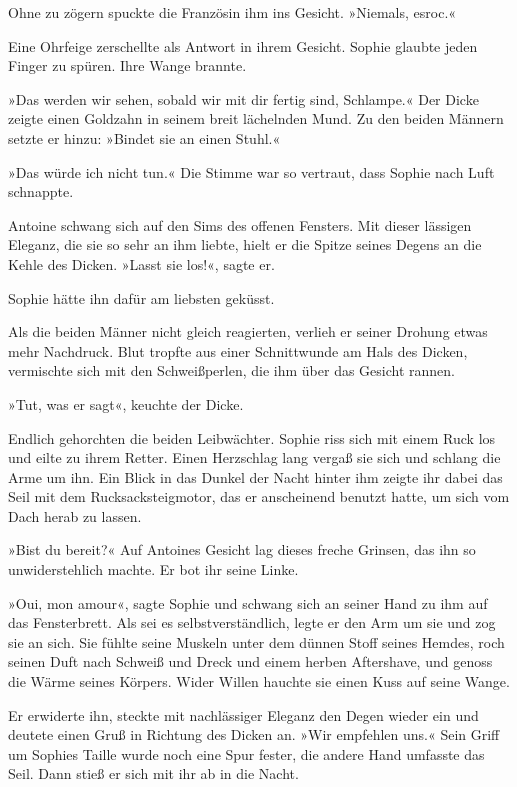 Ohne zu zögern spuckte die Französin ihm ins Gesicht. »Niemals,
esroc.«

Eine Ohrfeige zerschellte als Antwort in ihrem Gesicht. Sophie
glaubte jeden Finger zu spüren. Ihre Wange brannte.

»Das werden wir sehen, sobald wir mit dir fertig sind, Schlampe.«
Der Dicke zeigte einen Goldzahn in seinem breit lächelnden Mund. Zu
den beiden Männern setzte er hinzu: »Bindet sie an einen Stuhl.«

»Das würde ich nicht tun.« Die Stimme war so vertraut, dass Sophie
nach Luft schnappte.

Antoine schwang sich auf den Sims des offenen Fensters. Mit dieser
lässigen Eleganz, die sie so sehr an ihm liebte, hielt er die
Spitze seines Degens an die Kehle des Dicken. »Lasst sie los!«,
sagte er.

Sophie hätte ihn dafür am liebsten geküsst.

Als die beiden Männer nicht gleich reagierten, verlieh er seiner
Drohung etwas mehr Nachdruck. Blut tropfte aus einer Schnittwunde
am Hals des Dicken, vermischte sich mit den Schweißperlen, die ihm
über das Gesicht rannen.

»Tut, was er sagt«, keuchte der Dicke.

Endlich gehorchten die beiden Leibwächter. Sophie riss sich mit
einem Ruck los und eilte zu ihrem Retter. Einen Herzschlag lang
vergaß sie sich und schlang die Arme um ihn. Ein Blick in das
Dunkel der Nacht hinter ihm zeigte ihr dabei das Seil mit dem
Rucksacksteigmotor, das er anscheinend benutzt hatte, um sich vom
Dach herab zu lassen.

»Bist du bereit?« Auf Antoines Gesicht lag dieses freche Grinsen,
das ihn so unwiderstehlich machte. Er bot ihr seine Linke.

»Oui, mon amour«, sagte Sophie und schwang sich an seiner Hand zu
ihm auf das Fensterbrett. Als sei es selbstverständlich, legte er
den Arm um sie und zog sie an sich. Sie fühlte seine Muskeln unter
dem dünnen Stoff seines Hemdes, roch seinen Duft nach Schweiß und
Dreck und einem herben Aftershave, und genoss die Wärme seines
Körpers. Wider Willen hauchte sie einen Kuss auf seine Wange.

Er erwiderte ihn, steckte mit nachlässiger Eleganz den Degen wieder
ein und deutete einen Gruß in Richtung des Dicken an. »Wir
empfehlen uns.« Sein Griff um Sophies Taille wurde noch eine Spur
fester, die andere Hand umfasste das Seil. Dann stieß er sich mit
ihr ab in die Nacht.

